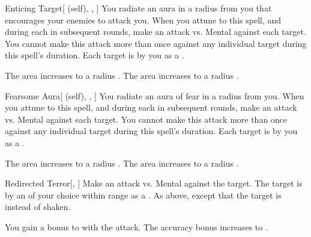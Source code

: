 \lowercase{\hypertarget{spell:Enticing Target}{}}\label{spell:Enticing Target}
\begin{attuneability}[Rank 3]{\hypertarget{spell:Enticing Target}{Enticing Target}}[ (self), , ]
You radiate an aura in a \areasmall radius  from you that encourages your enemies to attack you.
When you attune to this spell, and during each  in subsequent rounds, make an attack vs. Mental against each target.
You cannot make this attack more than once against any individual target during this spell's duration.
\hit Each target is  by you as a .

\rankline
{} The area increases to a \areamed radius .
 The area increases to a \arealarge radius .
\end{attuneability}
\vspace{0.25em}



\lowercase{\hypertarget{spell:Fearsome Aura}{}}\label{spell:Fearsome Aura}
\begin{attuneability}[Rank 3]{\hypertarget{spell:Fearsome Aura}{Fearsome Aura}}[ (self), , ]
You radiate an aura of fear in a \areamed radius  from you.
When you attune to this spell, and during each  in subsequent rounds, make an attack vs. Mental against each target.
You cannot make this attack more than once against any individual target during this spell's duration.
\hit Each target is  by you as a .

\rankline
{} The area increases to a \arealarge radius .
 The area increases to a \areahuge radius .
\end{attuneability}
\vspace{0.25em}



\lowercase{\hypertarget{spell:Redirected Terror}{}}\label{spell:Redirected Terror}
\begin{freeability}[Rank 3]{\hypertarget{spell:Redirected Terror}{Redirected Terror}}[, ]
Make an attack vs. Mental against the target.
\hit The target is \shaken by an  of your choice within range as a .
\crit As above, except that the target is \panicked instead of shaken.

\rankline
{} You gain a  bonus to  with the attack.
 The accuracy bonus increases to .
\end{freeability}
\vspace{0.25em}



